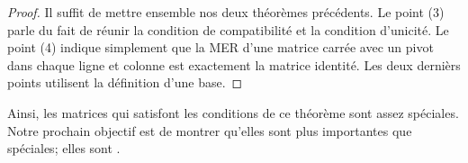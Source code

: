 \begin{proof}
Il suffit de mettre ensemble nos deux théorèmes précédents.
Le point (3) parle du fait de réunir la condition de compatibilité et la condition d'unicité.  Le point 
(4) indique simplement que la MER d'une matrice carrée
avec un pivot dans chaque ligne et colonne est exactement
la matrice identité.  Les deux derni\`ers points utilisent  la définition d'une base.
\end{proof}

Ainsi, les matrices qui satisfont les conditions de ce théorème sont 
assez spéciales. Notre prochain objectif est de montrer qu'elles sont plus importantes que spéciales; elles sont .

